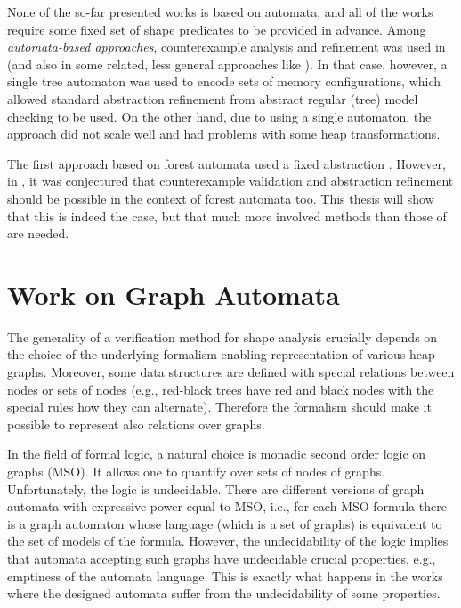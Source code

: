           None of the so-far presented works is based on automata,
          and all of the works require some fixed set of shape predicates to be provided
          in advance. Among \emph{automata-based approaches}, counterexample analysis and
          refinement was used in \cite{bhrv06b} (and also in some related, less general
          approaches like \cite{bhmv05}). In that case, however, a single tree automaton
          was used to encode sets of memory configurations, which allowed standard
          abstraction refinement from abstract regular (tree) model checking
          \cite{artmc} to be used. On the other hand, due to using a single automaton,
          the approach did not scale well and had problems with some heap transformations.

          The first approach based on forest automata used a fixed abstraction \cite{forester12}.
          However, in \cite{forester12,boxes13}, it was conjectured that counterexample validation and
          abstraction refinement should be possible in the context of forest
          automata too. This thesis will show that this is indeed the case, but that much
          more involved methods than those of \cite{artmc} are needed.

	\section{Work on Graph Automata}

	The generality of a verification method for shape analysis crucially depends on the choice
	of the underlying formalism enabling representation of various heap graphs.
	Moreover, some data structures are defined with special relations
	between nodes or sets of nodes (e.g., red-black trees have red and black nodes with
	the special rules how they can alternate).
	Therefore the formalism should make it possible to represent also relations over graphs.

	In the field of formal logic, a natural choice is monadic second order logic on graphs (MSO).
	It allows one to quantify over sets of nodes of graphs.
	Unfortunately, the logic is undecidable.
        There are different versions of graph automata with expressive power equal to MSO, i.e., for
        each MSO formula there is a graph automaton whose language (which is a set of graphs) is equivalent
        to the set of models of the formula.
	However, the undecidability of the logic implies that automata accepting such graphs have undecidable
	crucial properties, e.g., emptiness of the automata language.
	This is exactly what happens in the works \cite{Thomas:automata, soa-reiter15} where the designed automata
	suffer from the undecidability of some properties.

